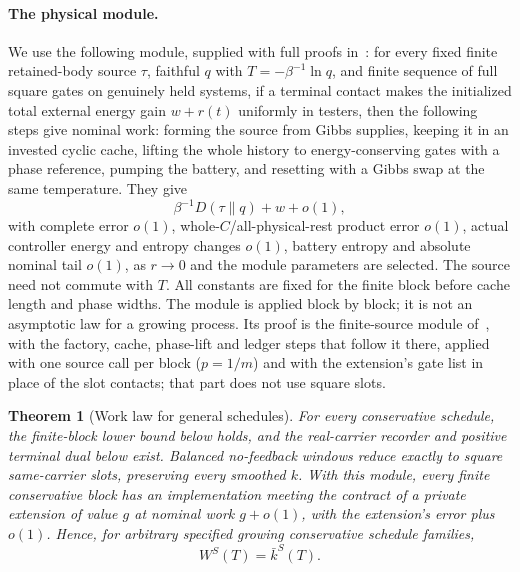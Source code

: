 \documentclass[11pt]{article}
\newtheorem{theorem}{Theorem}
\theoremstyle{definition}
\theoremstyle{remark}
\begin{document}
\paragraph{The physical module.}
We use the following module, supplied with full proofs in~\cite[App.~E]{Answering}: for every fixed finite retained-body source $\tau$, faithful $q$ with $T=-\beta^{-1}\ln q$, and finite sequence of full square gates on genuinely held systems, if a terminal contact makes the initialized total external energy gain $w+r(t)$ uniformly in testers, then the following steps give nominal work: forming the source from Gibbs supplies, keeping it in an invested cyclic cache, lifting the whole history to energy-conserving gates with a phase reference, pumping the battery, and resetting with a Gibbs swap at the same temperature. They give
\[
\beta^{-1}D(\tau\|q)+w+o(1),
\]
with complete error $o(1)$, whole-$C$/all-physical-rest product error $o(1)$, actual controller energy and entropy changes $o(1)$, battery entropy and absolute nominal tail $o(1)$, as $r\to0$ and the module parameters are selected. The source need not commute with $T$. All constants are fixed for the finite block before cache length and phase widths. The module is applied block by block; it is not an asymptotic law for a growing process. Its proof is the finite-source module of~\cite[App.~E]{Answering}, with the factory, cache, phase-lift and ledger steps that follow it there, applied with one source call per block ($p=1/m$) and with the extension's gate list in place of the slot contacts; that part does not use square slots.

\begin{theorem}[Work law for general schedules]\label{sc-thm:scope}
For every conservative schedule, the finite-block lower bound below holds, and the real-carrier recorder and positive terminal dual below exist. Balanced no-feedback windows reduce exactly to square same-carrier slots, preserving every smoothed $k$. With this module, every finite conservative block has an implementation meeting the contract of a private extension of value $g$ at nominal work $g+o(1)$, with the extension's error plus $o(1)$. Hence, for arbitrary specified growing conservative schedule families,
\[
W^S(T)=\bar k^S(T).
\]
\end{theorem}
\end{document}
